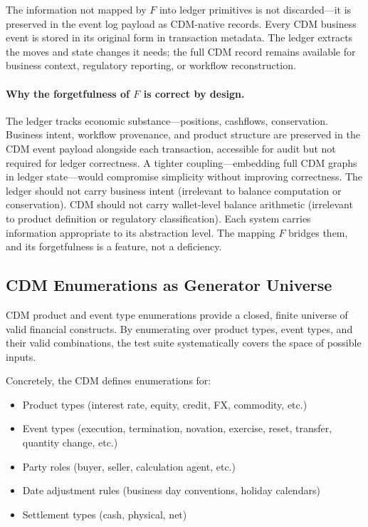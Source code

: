 \documentclass[11pt,a4paper]{article}
\begin{document}
The information not mapped by $F$ into ledger primitives is not discarded---it is preserved in the event log payload as CDM-native records. Every CDM business event is stored in its original form in transaction metadata. The ledger extracts the moves and state changes it needs; the full CDM record remains available for business context, regulatory reporting, or workflow reconstruction.

\paragraph{Why the forgetfulness of $F$ is correct by design.}
The ledger tracks economic substance---positions, cashflows, conservation. Business intent, workflow provenance, and product structure are preserved in the CDM event payload alongside each transaction, accessible for audit but not required for ledger correctness. A tighter coupling---embedding full CDM graphs in ledger state---would compromise simplicity without improving correctness. The ledger should not carry business intent (irrelevant to balance computation or conservation). CDM should not carry wallet-level balance arithmetic (irrelevant to product definition or regulatory classification). Each system carries information appropriate to its abstraction level. The mapping $F$ bridges them, and its forgetfulness is a feature, not a deficiency.

\subsection{CDM Enumerations as Generator Universe}

CDM product and event type enumerations provide a closed, finite universe of valid financial constructs. By enumerating over product types, event types, and their valid combinations, the test suite systematically covers the space of possible inputs.

Concretely, the CDM defines enumerations for:
\begin{itemize}[nosep]
\item Product types (interest rate, equity, credit, FX, commodity, etc.)
\item Event types (execution, termination, novation, exercise, reset, transfer, quantity change, etc.)
\item Party roles (buyer, seller, calculation agent, etc.)
\item Date adjustment rules (business day conventions, holiday calendars)
\item Settlement types (cash, physical, net)
\end{itemize}
\end{document}
